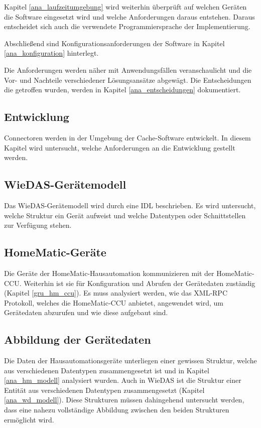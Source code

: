Kapitel \ref{ana_laufzeitumgebung} wird weiterhin überprüft auf welchen Geräten die Software eingesetzt wird
und welche Anforderungen daraus entstehen.
Daraus entscheidet sich auch die verwendete Programmiersprache der Implementierung.

Abschließend sind Konfigurationsanforderungen der Software in Kapitel \ref{ana_konfiguration} hinterlegt.

Die Anforderungen werden näher mit Anwendungsfällen veranschaulicht und die Vor- und Nachteile
verschiedener Lösungsansätze abgewägt.
Die Entscheidungen die getroffen wurden, werden in Kapitel \ref{ana_entscheidungen} dokumentiert.

\subsection{Entwicklung}

Connectoren werden in der Umgebung der Cache-Software entwickelt.
In diesem Kapitel wird untersucht, welche Anforderungen an die Entwicklung gestellt werden.

\subsection{WieDAS-Gerätemodell}

Das WieDAS-Gerätemodell wird durch eine IDL beschrieben.
Es wird untersucht, welche Struktur ein Gerät aufweist und welche Datentypen oder Schnittstellen
zur Verfügung stehen.

\subsection{HomeMatic-Geräte}

Die Geräte der HomeMatic-Hausautomation kommunizieren mit der HomeMatic-CCU.
Weiterhin ist sie für Konfiguration und Abrufen der Gerätedaten zuständig (Kapitel \ref{gru_hm_ccu}).
Es muss analysiert werden, wie das XML-RPC Protokoll, welches die HomeMatic-CCU anbietet,
angewendet wird, um Gerätedaten abzurufen und wie diese aufgebaut sind.

\subsection{Abbildung der Gerätedaten}

Die Daten der Hausautomationsgeräte unterliegen einer gewissen Struktur, welche aus verschiedenen
Datentypen zusammengesetzt ist und in Kapitel \ref{ana_hm_modell} analysiert wurden.
Auch in WieDAS ist die Struktur einer Entität aus verschiedenen Datentypen zusammengesetzt (Kapitel \ref{ana_wd_modell}).
Diese Strukturen müssen dahingehend untersucht werden, dass eine nahezu vollständige Abbildung
zwischen den beiden Strukturen ermöglicht wird.


